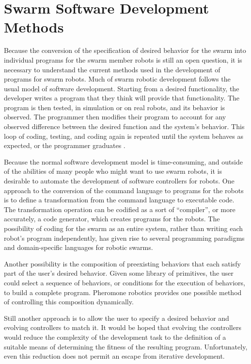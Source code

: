 \section{Swarm Software Development Methods}

Because the conversion of the specification of desired behavior for the swarm into individual programs for the swarm member robots is still an open question, it is necessary to understand the current methods used in the development of programs for swarm robots. 
Much of swarm robotic development follows the usual model of software development. 
Starting from a desired functionality, the developer writes a program that they think will provide that functionality.
The program is then tested, in simulation or on real robots, and its behavior is observed. 
The programmer then modifies their program to account for any observed difference between the desired function and the system's behavior. 
This loop of coding, testing, and coding again is repeated until the system behaves as expected, or the programmer graduates \citep{cham2010graduate}. 

Because the normal software development model is time-consuming, and outside of the abilities of many people who might want to use swarm robots, it is desirable to automate the development of software controllers for robots. 
One approach to the conversion of the command language to programs for the robots is to define a transformation from the command language to executable code. 
The transformation operation can be codified as a sort of ``compiler'', or more accurately, a code generator, which creates programs for the robots. 
The possibility of coding for the swarm as an entire system, rather than writing each robot's program independently, has given rise to several programming paradigms and domain-specific languages for robotic swarms. 

Another possibility is the composition of preexisting behaviors that each satisfy part of the user's desired behavior. 
Given some library of primitives, the user could select a sequence of behaviors, or conditions for the execution of behaviors, to build a complete program. 
Pheromone robotics provides one possible method of controlling this composition dynamically.
 
Still another approach is to allow the user to specify a desired behavior and evolving controllers to match it. 
It would be hoped that evolving the controllers would reduce the complexity of the development task to the definition of a suitable means of determining the fitness of the resulting program. 
Unfortunately, even this reduction does not permit an escape from iterative development. 

